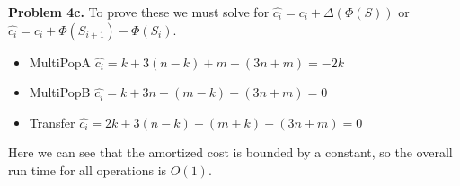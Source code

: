 \documentclass{article}
\begin{document}
\textbf{Problem 4c.} To prove these we must solve for $\hat{c_i} = c_i + \Delta(\Phi(S))$ or $\hat{c_i} = c_i + \Phi(S_{i+1}) - \Phi(S_i)$. 

\begin{itemize}
    \item MultiPopA
    \subitem $\hat{c_i} = k + 3(n - k) + m - (3n + m) = -2k$ 
    \item MultiPopB
    \subitem $\hat{c_i} = k + 3n + (m - k) - (3n + m) = 0$
    \item Transfer
    \subitem $\hat{c_i} = 2k + 3(n-k) + (m + k) - (3n + m) = 0$
\end{itemize}

Here we can see that the amortized cost is bounded by a constant, so the overall run time for all operations is $O(1)$.

\newpage
 

\end{document}
